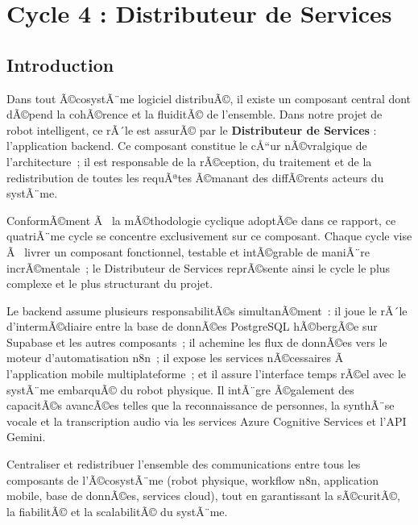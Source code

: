 ﻿\chapter{Cycle 4 : Distributeur de Services}

\section{Introduction}

Dans tout Ã©cosystÃ¨me logiciel distribuÃ©, il existe un composant
central dont dÃ©pend la cohÃ©rence et la fluiditÃ© de l'ensemble.
Dans notre projet de robot intelligent, ce rÃ´le est assurÃ© par
le \textbf{Distributeur de Services} : l'application backend.
Ce composant constitue le cÅ“ur nÃ©vralgique de l'architecture~;
il est responsable de la rÃ©ception, du traitement et de la
redistribution de toutes les requÃªtes Ã©manant des diffÃ©rents
acteurs du systÃ¨me.

ConformÃ©ment Ã  la mÃ©thodologie cyclique adoptÃ©e dans ce rapport,
ce quatriÃ¨me cycle se concentre exclusivement sur ce composant.
Chaque cycle vise Ã  livrer un composant fonctionnel, testable et
intÃ©grable de maniÃ¨re incrÃ©mentale~; le Distributeur de Services
reprÃ©sente ainsi le cycle le plus complexe et le plus structurant
du projet.

Le backend assume plusieurs responsabilitÃ©s simultanÃ©ment~: il
joue le rÃ´le d'intermÃ©diaire entre la base de donnÃ©es PostgreSQL
hÃ©bergÃ©e sur Supabase et les autres composants~; il achemine les
flux de donnÃ©es vers le moteur d'automatisation n8n~; il expose
les services nÃ©cessaires Ã  l'application mobile multiplateforme~;
et il assure l'interface temps rÃ©el avec le systÃ¨me embarquÃ© du
robot physique. Il intÃ¨gre Ã©galement des capacitÃ©s avancÃ©es telles
que la reconnaissance de personnes, la synthÃ¨se vocale et la
transcription audio via les services Azure Cognitive Services et
l'API Gemini.

\begin{tcolorbox}[colback=blue!5!white, colframe=blue!60!black,
  title=\textbf{RÃ´le principal du Distributeur de Services}]
Centraliser et redistribuer l'ensemble des communications entre
tous les composants de l'Ã©cosystÃ¨me (robot physique, workflow n8n,
application mobile, base de donnÃ©es, services cloud), tout en
garantissant la sÃ©curitÃ©, la fiabilitÃ© et la scalabilitÃ© du
systÃ¨me.
\end{tcolorbox}

